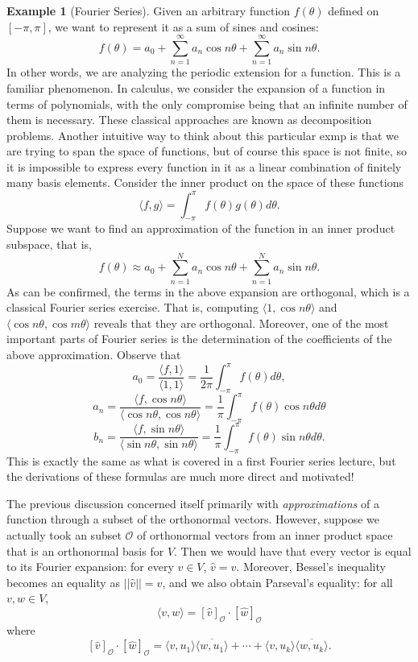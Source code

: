\documentclass[psamsfonts]{amsart}
\theoremstyle{definition}
\newtheorem{exmp}[thm]{Example}
\theoremstyle{remark}
\numberwithin{equation}{section}
\begin{document}
\begin{exmp}[Fourier Series]
Given an arbitrary function $f(\theta)$ defined on $[-\pi, \pi ]$, we want to represent it as a sum of sines and cosines: 
$$f(\theta) = a_0 + \sum _{n = 1} ^ \infty a_n \cos n \theta  +\sum _{n = 1} ^ \infty a_n \sin n \theta .$$
In other words, we are analyzing the periodic extension for a function. This is a familiar phenomenon. In calculus, we consider the expansion of a function in terms of polynomials, with the only compromise being that an infinite number of them is necessary. These classical approaches are known as decomposition problems. Another intuitive way to think about this particular exmp is that we are trying to span the space of functions, but of course this space is not finite, so it is impossible to express every function in it as a linear combination of finitely many basis elements. Consider the inner product on the space of these functions 
$$\langle f, g \rangle = \int _{- \pi} ^\pi f(\theta) g(\theta) d \theta . $$
Suppose we want to find an approximation of the function in an inner product subspace, that is, 
$$f(\theta) \approx a_0 + \sum _{n = 1} ^N a_n \cos n \theta  +\sum _{n = 1} ^ N a_n \sin n \theta .$$
As can be confirmed, the terms in the above expansion are orthogonal, which is a classical Fourier series exercise. That is, computing $\langle 1, \cos n \theta \rangle$ and $\langle \cos n \theta, \cos m \theta \rangle$ reveals that they are orthogonal. Moreover, one of the most important parts of Fourier series is the determination of the coefficients of the above approximation. Observe that 
$$a_0 = \frac{\langle f, 1 \rangle}{\langle 1, 1 \rangle} = \frac{1}{2\pi} \int _{-\pi} ^\pi f(\theta) d\theta,$$
$$a_n = \frac{\langle f, \cos n \theta \rangle}{\langle \cos n \theta, \cos n \theta \rangle} = \frac{1}{\pi} \int _{-\pi} ^\pi f(\theta) \cos n \theta d \theta $$
$$b_n = \frac{\langle f, \sin n \theta \rangle}{\langle \sin n \theta, \sin n \theta \rangle} = \frac{1}{\pi} \int _{-\pi} ^\pi f(\theta) \sin n \theta d \theta.$$
This is exactly the same as what is covered in a first Fourier series lecture, but the derivations of these formulas are much more direct and motivated! 
\end{exmp}

The previous discussion concerned itself primarily with \textit{approximations} of a function through a subset of the orthonormal vectors. However, suppose we actually took an subset $\mathcal{O}$ of orthonormal vectors from an inner product space that is an orthonormal basis for $V$. Then we would have that every vector is equal to its Fourier expansion: for every $v \in V$, $\hat{v} = v$. Moreover, Bessel's inequality becomes an equality as $|| \hat{v} || = v$, and we also obtain Parseval's equality: for all $v, w \in V$, 
$$\langle v, w \rangle = [\hat{v} ]_{\mathcal{O}} \cdot [\hat{w}] _{\mathcal{O}} $$
where 
$$[\hat{v} ]_{\mathcal{O}} \cdot [\hat{w}] _{\mathcal{O}} = \langle v, u_1 \rangle \overline{\langle w, u_1 \rangle} + \cdots + \langle v, u_k \rangle \overline{\langle w, u_k \rangle}.$$
\end{document}
